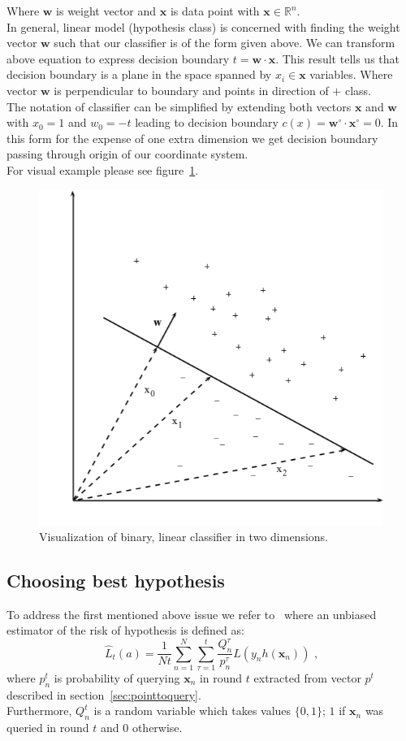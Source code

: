 \documentclass[12pt, a4paper, pdflatex]{report}
\begin{document}
Where $\mathbf{w}$ is weight vector and $\mathbf{x}$ is data point with $\mathbf{x} \in \mathbb{R}^n$.\\
In general, linear model (hypothesis class) is concerned with finding the weight vector $\mathbf{w}$ such that our classifier is of the form given above. We can transform above equation to express decision boundary $t = \mathbf{w} \cdot \mathbf{x}$. This result tells us that decision boundary is a plane in the space spanned by $x_i \in \mathbf{x}$ variables. Where vector $\mathbf{w}$ is perpendicular to boundary and points in direction of $+$ class.\\
The notation of classifier can be simplified by extending both vectors $\mathbf{x}$ and $\mathbf{w}$ with $x_0 = 1$ and $w_0 = -t$ leading to decision boundary $c(x) = \mathbf{w}^{\circ} \cdot \mathbf{x}^{\circ} = 0$. In this form for the expense of one extra dimension we get decision boundary passing through origin of our coordinate system.\\
For visual example please see figure~\ref{fig:binclas}.\\

\begin{figure}[htbp]
  \centering
  \includegraphics[width=0.5\linewidth]{graphics/binclas.png}
  \begin{tiny}
    \caption{Visualization of binary, linear classifier in two dimensions.\label{fig:binclas}}
  \end{tiny}
  \vspace{1cm}
\end{figure}

\subsection{Choosing best hypothesis}
To address the first mentioned above issue we refer to~\cite{DBLP:journals/corr/GantiG13} where an unbiased estimator of the risk of hypothesis is defined as:\\
$$
\hat{L}_t(a) = \frac{1}{Nt} \sum_{n=1}^{N} \sum_{\tau = 1}^{t} \frac{Q^{\tau}_n}{p^{\tau}_n} L(y_n h(\mathbf{x}_n)) \text{~,}
$$
where $p^t_n$ is probability of querying $\mathbf{x}_n$ in round $t$ extracted from vector $p^t$ described in section~\ref{sec:pointtoquery}.\\
Furthermore, $Q^t_n$ is a random variable which takes values $\{0,1\}$; $1$ if $\mathbf{x}_n$ was queried in round $t$ and $0$ otherwise.\\
\end{document}
